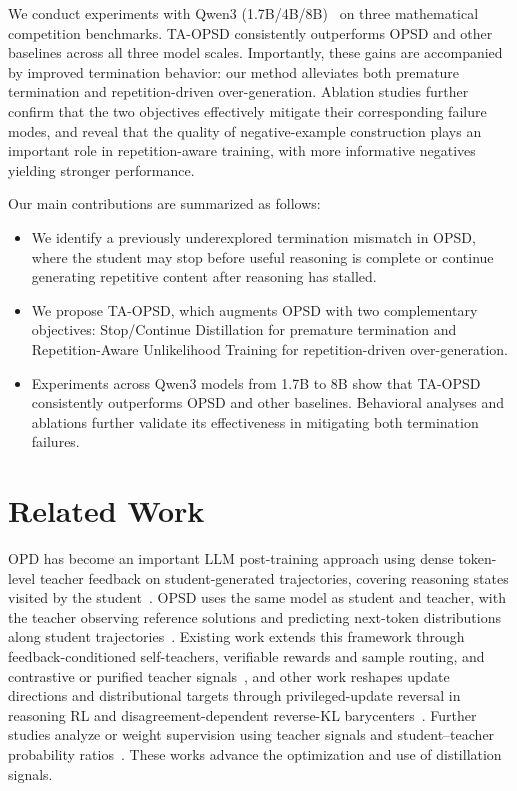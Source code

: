 \documentclass{article} %
\newcommand{\name}[0]{TA-OPSD}
\begin{document}
We conduct experiments with Qwen3 (1.7B/4B/8B)~\citep{qwen3} on three mathematical competition benchmarks. \name{} consistently outperforms OPSD and other baselines across all three model scales. Importantly, these gains are accompanied by improved termination behavior: our method alleviates both premature termination and repetition-driven over-generation. Ablation studies further confirm that the two objectives effectively mitigate their corresponding failure modes, and reveal that the quality of negative-example construction plays an important role in repetition-aware training, with more informative negatives yielding stronger performance.

Our main contributions are summarized as follows:
\begin{itemize}
    \item We identify a previously underexplored termination mismatch in OPSD, where the student may stop before useful reasoning is complete or continue generating repetitive content after reasoning has stalled.
    \item We propose TA-OPSD, which augments OPSD with two complementary objectives: Stop/Continue Distillation for premature termination and Repetition-Aware Unlikelihood Training for repetition-driven over-generation.
    \item Experiments across Qwen3 models from 1.7B to 8B show that TA-OPSD consistently outperforms OPSD and other baselines. Behavioral analyses and ablations further validate its effectiveness in mitigating both termination failures.
\end{itemize}


\section{Related Work}
\label{sec:related-work}

OPD has become an important LLM post-training approach using dense token-level teacher feedback on student-generated trajectories, covering reasoning states visited by the student~\citep{gkd,gu2026minillmonpolicydistillationlarge,lu2025onpolicydistillation}. OPSD uses the same model as student and teacher, with the teacher observing reference solutions and predicting next-token distributions along student trajectories~\citep{opsd}. Existing work extends this framework through feedback-conditioned self-teachers, verifiable rewards and sample routing, and contrastive or purified teacher signals~\citep{sdpo,rlsd,srpo,rlcsd,purified}, and other work reshapes update directions and distributional targets through privileged-update reversal in reasoning RL and disagreement-dependent reverse-KL barycenters~\citep{antisd,demopsd}. Further studies analyze or weight supervision using teacher signals and student--teacher probability ratios~\citep{egrsd,pwopsd,sopd,rosd,renio}. These works advance the optimization and use of distillation signals.
\end{document}
